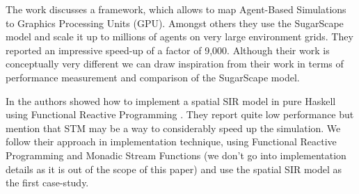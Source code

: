 The work \cite{lysenko_framework_2008} discusses a framework, which allows to map Agent-Based Simulations to Graphics Processing Units (GPU). Amongst others they use the SugarScape model \cite{epstein_growing_1996} and scale it up to millions of agents on very large environment grids. They reported an impressive speed-up of a factor of 9,000. Although their work is conceptually very different we can draw inspiration from their work in terms of performance measurement and comparison of the SugarScape model.

In \cite{thaler_pure_2019} the authors showed how to implement a spatial SIR model in pure Haskell using Functional Reactive Programming \cite{hudak_arrows_2003}. They report quite low performance but mention that STM may be a way to considerably speed up the simulation. We follow their approach in implementation technique, using Functional Reactive Programming and Monadic Stream Functions \cite{perez_functional_2016} (we don't go into implementation details as it is out of the scope of this paper) and use the spatial SIR model as the first case-study.


